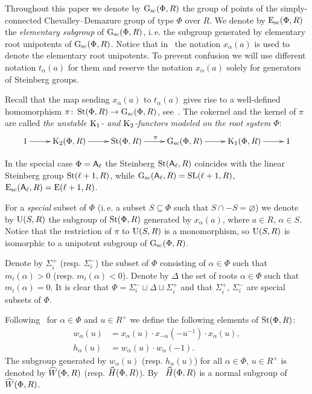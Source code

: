 Throughout this paper we denote by $\operatorname{G}_\mathrm{sc}(\Phi, R)$ the group of points of the simply-connected Chevalley--Demazure group of type $\Phi$ over $R$.
We denote by $\operatorname{E}_\mathrm{sc}(\Phi, R)$ the \textit{elementary subgroup} of $\operatorname{G}_\mathrm{sc}(\Phi, R)$, i.\,e. the subgroup generated by elementary root unipotents of $\operatorname{G}_\mathrm{sc}(\Phi, R)$.
Notice that in~\cite{VP, Vav09} the notation $x_\alpha(a)$ is used to denote the elementary root unipotents.
To prevent confusion we will use different notation $t_\alpha(a)$ for them and reserve the notation $x_\alpha(a)$ solely for generators of Steinberg groups.

Recall that the map sending $x_\alpha(a)$ to $t_\alpha(a)$ gives rise to a well-defined homomorphism $\pi \colon \operatorname{St}(\Phi, R) \to \operatorname{G}_\mathrm{sc}(\Phi, R)$, see~\cite[\S~1A]{St78}.
The cokernel and the kernel of $\pi$ are called \textit{the unstable $\operatorname{K}_1$- and $\operatorname{K}_2$-functors modeled on the root system $\Phi$}:
\begin{equation} \label{eq:K1-K2-sequence}
  \xymatrix{ 1 \ar[r] & \K_2(\Phi, R) \ar[r] & \St(\Phi, R) \ar[r]^{\pi} & \Gsc(\Phi, R) \ar[r] & \K_1(\Phi, R) \ar[r] & 1}
\end{equation}

In the special case $\Phi =\mathsf{A}_\ell$ the Steinberg $\operatorname{St}(\mathsf{A}_\ell, R)$ coincides with the linear Steinberg group $\operatorname{St}(\ell + 1, R)$, while
  $\operatorname{G}_\mathrm{sc}(\mathsf{A}_\ell, R) = \mathrm{SL}(\ell + 1, R)$, $\operatorname{E}_\mathrm{sc}(\mathsf{A}_\ell, R) = \operatorname{E}(\ell + 1, R)$.

For a \textit{special} subset of $\Phi$ (i.\,e. a subset $S \subseteq \Phi$ such that $S \cap -S = \varnothing$)
we denote by $\operatorname{U}(S, R)$ the subgroup of $\operatorname{St}(\Phi, R)$ generated by $x_\alpha(a)$, where $a \in R$, $\alpha \in S$.
Notice that the restriction of $\pi$ to $\operatorname{U}(S, R)$ is a monomorphism, so $\operatorname{U}(S, R)$ is isomorphic to a unipotent subgroup of $\operatorname{G}_\mathrm{sc}(\Phi, R)$.

Denote by $\Sigma^+_i$ (resp. $\Sigma^-_i$) the subset of $\Phi$ consisting of $\alpha \in \Phi$ such that $m_i(\alpha) > 0$ (resp. $m_i(\alpha) < 0$).
Denote by $\Delta$ the set of roots $\alpha \in \Phi$ such that $m_i(\alpha) = 0$.
It is clear that $\Phi = \Sigma_i^- \sqcup \Delta \sqcup \Sigma_i^+$ and that $\Sigma_i^+$, $\Sigma_i^-$ are special subsets of $\Phi$.

Following~\cite{Ma69} for $\alpha\in\Phi$ and $u \in R^\times$ we define the following elements of $\operatorname{St}(\Phi, R)$:
\begin{align} w_\alpha(u) & =  x_\alpha(u) \cdot x_{-\alpha}(-u^{-1}) \cdot x_\alpha(u), \label{eq:w-definition} \\
               h_\alpha(u) & =  w_\alpha(u) \cdot w_\alpha(-1).  \label{eq:h-definition} \end{align}
The subgroup generated by $w_\alpha(u)$ (resp. $h_\alpha(u)$) for all $\alpha\in \Phi$, $u \in R^\times$ is denoted by $\widehat{W}(\Phi, R)$ (resp. $\widehat{H}(\Phi, R)$).
By~\cite[Lemme~5.2]{Ma69} $\widehat{H}(\Phi, R)$ is a normal subgroup of $\widehat{W}(\Phi, R)$.

